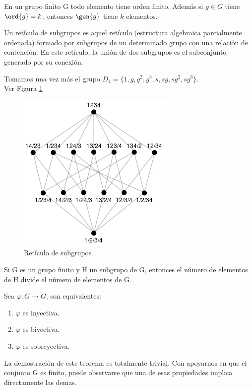 \documentclass{apuntes}
\begin{document}
  \begin{theorem}
   En un grupo finito G todo elemento tiene orden finito. Además si $g\in G$ tiene $\ord{g}=k$, entonces $\gen{g}$ tiene $k$ elementos.
  \end{theorem}

  \begin{defn}
   Un retículo de subgrupos es aquel retículo (estructura algebraica parcialmente ordenada) formado por subgrupos de un determinado grupo
   con una relación de contención. En este retículo, la unión de dos subgrupos es el subconjunto generado por su conexión.
  \end{defn}

  \begin{example}
   Tomamos una vez más el grupo $D_{4}=\{1,g,g^{2}, g^{3}, s, sg, sg^{2}, sg^{3}\}$.\\ Ver Figura \ref{Reticulo}\\
  \end{example}
  
   \begin{figure}[h]
   	\centering
	\includegraphics[scale=1]{Reticulo.jpg}   
	\caption{Retículo de subgrupos.}
	\label{Reticulo}
   \end{figure}

  \begin{theorem}
   Si G es un grupo finito y H un subgrupo de G, entonces el número de elementos de H divide el número de elementos de G.
  \end{theorem}
  
  \begin{lemma}
   Sea $\varphi: G\rightarrow G$, son equivalentes:
   \begin{enumerate}
    \item $\varphi$  es inyectiva.
    \item $\varphi$  es biyectiva.
    \item $\varphi$  es sobreyectiva.
   \end{enumerate}
  \end{lemma}
  La demostración de este teorema es totalmente trivial. Con apoyarnos en que el conjunto G es finito, puede observarse que una de
  esas propiedades implica directamente las demas.
  
\end{document}
